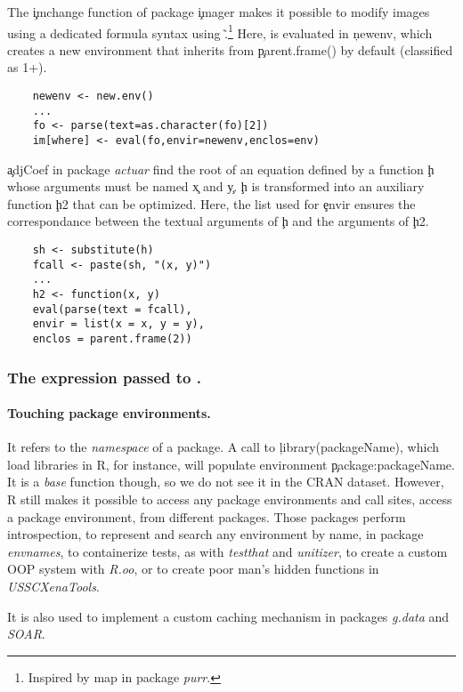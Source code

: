 \documentclass[screen,acmsmall]{acmart}
\begin{document}
The \c{imchange} function of package \c{imager} makes it possible to
modify images using a dedicated formula syntax using
\~.\footnote{Inspired by {map} in package \emph{purr}.} Here,
\eval is evaluated in \c{newenv}, which creates a new environment that
inherits from \c{parent.frame()} by default (classified as 1+).


\begin{lstlisting}
	newenv <- new.env()
	...
	fo <- parse(text=as.character(fo)[2])
	im[where] <- eval(fo,envir=newenv,enclos=env)
\end{lstlisting}

\c{adjCoef} in package \emph{actuar} find the root of an equation
defined by a function \c{h} whose arguments must be named \c{x} and
\c{y}. \c{h} is transformed into an auxiliary function \c{h2} that can
be optimized. Here, the list used for \c{envir} ensures the
correspondance between the textual arguments of \c{h} and the
arguments of \c{h2}.


\begin{lstlisting}
	sh <- substitute(h)
	fcall <- paste(sh, "(x, y)")
	...
	h2 <- function(x, y)
	eval(parse(text = fcall),
	envir = list(x = x, y = y),
	enclos = parent.frame(2))
\end{lstlisting}


\subsubsection{The expression passed to \eval.}
\paragraph{Touching package environments.} It refers to the \emph{namespace} of a package. A call to \c{library(packageName)}, which load libraries in R, for instance, will populate environment \c{package:packageName}. It is a \emph{base} function though, so we do not see it in the CRAN dataset. However, R still makes it possible to access any package environments and \packageNbPackageEnvSites call sites, \ie \packagePackageEnvSitePercent access a package environment, from \packageNbPackageEnvPackages different packages. Those packages perform introspection, to represent and search any environment by name, in package \emph{envnames}, to containerize tests, as with \emph{testthat} and \emph{unitizer}, to create a custom OOP system with \emph{R.oo}, or to create poor man's hidden functions in \emph{USSCXenaTools}.

It is also used to implement a custom caching mechanism in packages \emph{g.data} and \emph{SOAR}.
\end{document}
